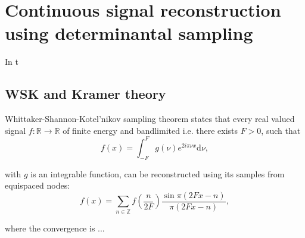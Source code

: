 \documentclass[twoside,11pt]{book}
\numberwithin{theorem}{chapter}
\numberwithin{definition}{chapter}
\numberwithin{proposition}{chapter}
\numberwithin{corollary}{chapter}
\numberwithin{example}{chapter}
\numberwithin{lemma}{chapter}
\numberwithin{assumption}{chapter}
\numberwithin{equation}{chapter}
\numberwithin{figure}{chapter}
\DeclareMathOperator{\VS}{\mathrm{VS}}
\DeclareMathOperator{\EX}{\mathbb{E}}
\DeclareMathOperator{\F}{\mathcal{F}}
\begin{document}








\clearpage

\chapter{Continuous signal reconstruction using determinantal sampling}\label{chapter:signal_reconstruction}


In t
\section{WSK and Kramer theory}
Whittaker-Shannon-Kotel'nikov sampling theorem states that every real valued signal $f: \mathbb{R} \rightarrow \mathbb{R}$ of finite energy and bandlimited i.e. there exists $F >0$, such that
\begin{equation}
f(x) = \int_{-F}^{F} g(\nu) e^{2 i \pi \nu x } \mathrm{d}\nu,
\end{equation}

with $g$ is an integrable function, can be reconstructed using its samples from equispaced nodes:
\begin{equation}\label{eq:WSK_reconstruction}
f(x) = \sum\limits_{n \in \mathbb{Z}} f(\frac{n}{2F}) \frac{\sin \pi(2F x - n )}{\pi(2F x - n )},
\end{equation}

where the convergence is ...
\end{document}
